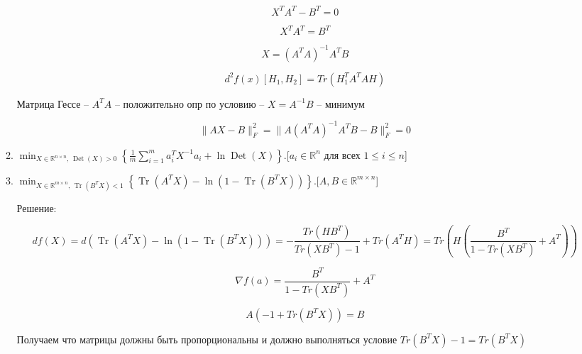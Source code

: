 \documentclass{article}
\newcommand{\R}{\mathbb{R}}
\DeclareMathOperator*{\Tr}{Tr}
\DeclareMathOperator*{\Det}{Det}
\begin{document}
\begin{enumerate}[label=\textbf{\arabic*}, leftmargin=0em]
\begin{enumerate}
$$
X^TA^T - B^T= 0
$$

$$
X^TA^T = B^T
$$

$$
X = (A^TA)^{-1}A^TB
$$

$$
d^2 f(x)[H_1, H_2] = Tr(H_1^TA^TAH)
$$

Матрица Гессе -- $A^TA$ -- положительно опр по условию -- $X = A^{-1}B$ -- минимум

$$
\| A X - B \|_F^2 =  \|A (A^TA)^{-1}A^TB - B \|_F^2 = 0
$$

\item $\displaystyle\min_{X \in \R^{n \times n}, \, \Det(X) > 0} \left\{ \frac{1}{m} \sum\limits_{i=1}^m a_i^T X^{-1} a_i + \ln \Det(X) \right\}$.\hfill[$a_i \in \R^n$ для всех $1 \leq i \leq n$]
\item $\displaystyle\min_{X \in \R^{m \times n}, \, \Tr(B^T X) < 1} \left\{ \Tr(A^T X) - \ln( 1 - \Tr(B^T X)) \right\}$.\hfill[$A, B \in \R^{m \times n}$]

Решение:

$$
df(X) = d(\Tr(A^T X) - \ln( 1 - \Tr(B^T X))) = -\frac{Tr(HB^T)}{Tr(XB^T) - 1} + Tr(A^TH) = Tr(H(\frac{B^T}{1 - Tr(XB^T)} + A^T))
$$

$$
\nabla f(a) = \frac{B^T}{1 - Tr(XB^T)} + A^T
$$

$$
A(-1 + Tr(B^TX)) = B
$$

Получаем что матрицы должны быть пропорциональны и должно выполняться условие $Tr(B^TX) - 1 = Tr(B^TX)$

\end{enumerate}

\end{enumerate}
\end{document}
